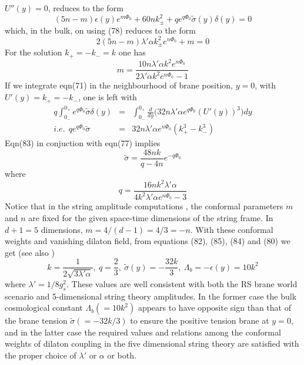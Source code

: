 \documentclass[a4paper,12pt]{article}
\newcommand {\nn} {\nonumber}
\begin{document}
$U''(y)=0$, reduces to the form
\begin{equation}
(5n-m)\epsilon(y)e^{m\Phi_0}+60n k_{\pm}^2
+q e^{q\Phi_0}\tilde{\sigma}(y)\delta(y)=0\nn
\end{equation}
which, in the bulk, on using (78) reduces to the form
\begin{equation}
2(5n-m)\lambda'\alpha k_{\pm}^2 e^{n\Phi_0}+m=0
\end{equation}
For the solution $k_+=-k_-=k$ one has
\begin{equation}
m=\frac{10n\lambda'\alpha k^2 e^{n\Phi_0}}{2\lambda'\alpha k^2 e^{n\Phi_0}-1}
\end{equation}
If we integrate eqn(71) in the neighbourhood of brane 
position, $y=0$, with $U'(y)=k_+=-k_-$, one is left with
\begin{eqnarray}
q \int_{0_-}^{0_+}e^{q\Phi_0}\tilde{\sigma}\delta(y)
&=&\int_{0_-}^{0_+}\frac{d}{dy}\big(32n\lambda'\alpha e^{q\Phi_0}(U'(y))^3\big)dy\nn\\
i.e.~~q e^{q\Phi_0}\tilde{\sigma}&=&32n\lambda'\alpha e^{n\Phi_0}
(k_+^3-k_-^3) 
\end{eqnarray} 
Eqn(83) in conjuction with eqn(77) implies
\begin{equation}
\tilde{\sigma}=\frac{48nk}{q-4n} e^{-q\Phi_0}
\end{equation}
where 
\begin{equation}
q=\frac{16nk^2\lambda'\alpha}{4k^2\lambda'\alpha e^{n\Phi_0}-3}
\end{equation}
Notice that in the string amplitude computations \cite{ESF,AAT}, the 
conformal parameters $m$ and $n$ are fixed for the given space-time 
dimensions of the string frame. 
In $d+1=5$ dimensions, $m= 4/{(d-1)} = 4/3 = -n $. With these 
conformal weights and vanishing dilaton field, from equations (82), (85), 
(84) and (80) we get (see also \cite{NIC})
\begin{equation}
k=\frac{1}{2\sqrt{3\lambda'\alpha}}, ~ q=\frac{2}{3},~ 
\tilde{\sigma}(y)=-\frac{32 k}{3}, ~ \Lambda_b=-\epsilon(y)=10 k^2
\end{equation}
where $\lambda'=1/{8 g_s^2}$. These values are well consistent with both the 
RS brane world scenario and 5-dimensional string theory amplitudes. In the 
former case the bulk cosmological constant $\Lambda_b (=10k^2)$ appears to 
have opposite sign than that of the brane tension $\tilde{\sigma} (=-32k/3)$ 
to ensure the positive tension brane at $y=0$, and in the latter case the 
required values and relations among the conformal weights of dilaton coupling 
in the five dimensional string theory are satisfied with the proper choice of 
$\lambda'$ or $\alpha$ or both. 
\end{document}
